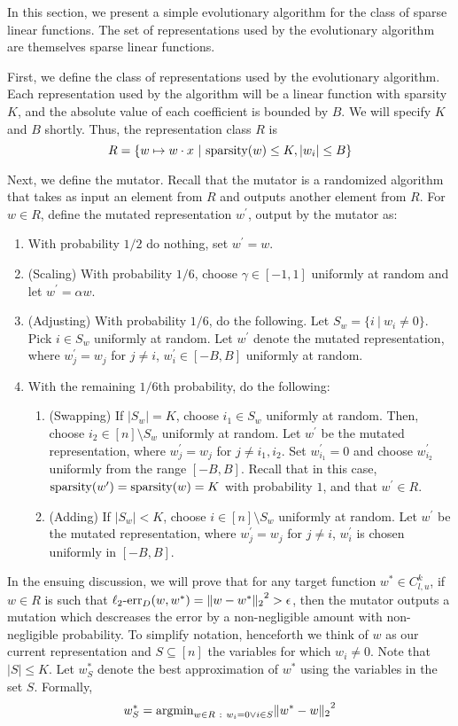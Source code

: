 In this section, we present a simple evolutionary algorithm for the class of
sparse linear functions. The set of representations used by the evolutionary
algorithm are themselves sparse linear functions.

First, we define the class of representations used by the evolutionary
algorithm. Each representation used by the algorithm will be a linear function
with sparsity $K$, and the absolute value of each coefficient is bounded by $B$.
We will specify $K$ and $B$ shortly. Thus, the representation class $R$ is
\[ 
R = \{ w \mapsto w \cdot x ~|~ \mathrm{sparsity}(w) \leq K, |w_i| \leq B \}
\]

Next, we define the mutator. Recall that the mutator is a randomized algorithm
that takes as input an element from $R$ and outputs another element from $R$.
For $w \in R$, define the mutated representation $w^\prime$, output by the mutator as:
\begin{enumerate}
\item With probability $1/2$ do nothing, set $w^\prime = w$.
\item (Scaling) With probability $1/6$, choose $\gamma \in [-1, 1]$ uniformly at random and
let $w^\prime = \alpha w$. 
\item (Adjusting) With probability $1/6$, do the following. Let $S_w = \{ i~|~ w_i \neq 0
\}$. Pick $i \in S_w$ uniformly at random. Let $w^\prime$ denote the
mutated representation, where $w^\prime_j = w_j$ for $j \neq i$, $w^\prime_i \in
[-B, B]$ uniformly at random. 
\item With the remaining $1/6$th probability, do the following:
\begin{enumerate}
\item (Swapping) If $|S_w| = K$, choose $i_1 \in S_w$ uniformly at random. Then, choose
$i_2 \in [n] \setminus S_w$ uniformly at random. Let $w^\prime$ be the mutated
representation, where $w_j^\prime = w_j$ for $j \neq i_1, i_2$. Set
$w_{i_1}^\prime = 0$ and choose $w_{i_2}^\prime$ uniformly from the range $[-B,
B]$. Recall that in this case, $\mathrm{sparsity}(w^\prime) = \mathrm{sparsity}(w) = K$ with
probability $1$, and that $w^\prime \in R$.
\item (Adding) If $|S_w| < K$, choose $i \in [n] \setminus S_w$ uniformly at random. Let
$w^\prime$ be the mutated representation, where $w_j^\prime = w_j$ for $j \neq
i$, $w^\prime_i$ is chosen uniformly in $[-B, B]$. 
\end{enumerate}
\end{enumerate}

In the ensuing discussion, we will prove that for any target function $w^* \in
C^k_{l,u}$, if $w \in R$ is such that $\mathrm{\ell_2\mbox{-}err}_D(w, w^*) = {\Vert w - w^* \Vert_{2}}^2 >
\epsilon$, then the mutator outputs a mutation which descreases the error by a
non-negligible amount with non-negligible probability. To simplify notation,
henceforth we think of $w$ as our current representation and $S \subseteq [n]$
the variables for which $w_i \neq 0$. Note that $|S| \leq K$.  Let $w^*_S$
denote the best approximation of $w^*$ using the variables in the set $S$.
Formally, 
\[ 
w^*_S = \mathrm{argmin}_{w \in R ~:~	w_i = 0 \vee i \in S} {\Vert w^*- w \Vert_{2}}^2
\]

